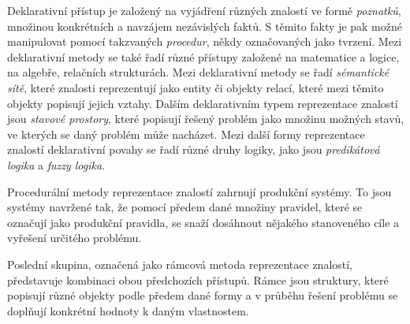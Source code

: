 Deklarativní přístup je založený na vyjádření různých znalostí ve formě \emph{poznatků}, množinou konkrétních a navzájem nezávislých faktů.
S těmito fakty je pak možné manipulovat pomocí takzvaných \emph{procedur}, někdy označovaných jako tvrzení.
Mezi deklarativní metody se také řadí různé přístupy založené na matematice a logice, na algebře, relačních strukturách.
Mezi deklarativní metody se řadí \emph{sémantické sítě}, které znalosti reprezentují jako entity či objekty
relací, které mezi těmito objekty popisují jejich vztahy.
Dalším deklarativním typem reprezentace znalostí jsou \emph{stavové prostory},
které popisují řešený problém jako množinu možných stavů, ve kterých se daný problém může nacházet.
Mezi další formy reprezentace znalostí deklarativní povahy se řadí různé druhy logiky,
jako jsou \emph{predikátová logika} a \emph{fuzzy logika}.~\cite{prepreze_znal}

Procedurální metody reprezentace znalostí zahrnují produkční systémy.
To jsou systémy navržené tak, že pomocí předem dané množiny pravidel, které se označují jako produkční pravidla,
se snaží dosáhnout nějakého stanoveného cíle a vyřešení určitého problému.~\cite{prepreze_znal}

Poslední skupina, označená jako rámcová metoda reprezentace znalostí, představuje kombinaci obou předchozích přístupů.
Rámce jsou struktury, které popisují různé objekty podle předem dané formy a v průběhu řešení
problému se doplňují konkrétní hodnoty k daným vlastnostem.~\cite{prepreze_znal}

